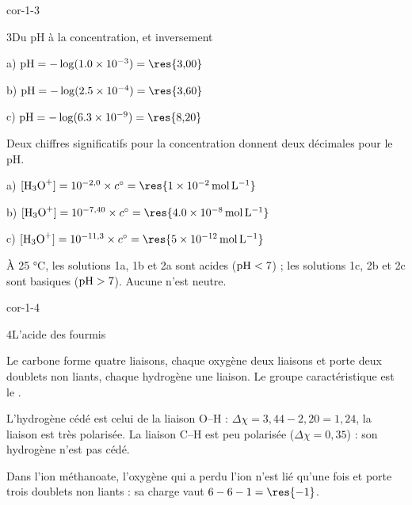 \begin{blocLivre}{cor-1-3}
\begin{corrige}{3}{Du pH à la concentration, et inversement}
\begin{questions}
\item a) $\pH=-\log(\num{1.0e-3})=\res{3{,}00}$\par
b) $\pH=-\log(\num{2.5e-4})=\res{3{,}60}$\par
c) $\pH=-\log(\num{6.3e-9})=\res{8{,}20}$\par
Deux chiffres significatifs pour la concentration donnent deux décimales pour le pH.
\item a) $\hho=10^{-2{,}0}\times\cst=\res{\qty{1e-2}{mol.L^{-1}}}$\par
b) $\hho=10^{-7{,}40}\times\cst=\res{\qty{4,0e-8}{mol.L^{-1}}}$\par
c) $\hho=10^{-11{,}3}\times\cst=\res{\qty{5e-12}{mol.L^{-1}}}$
\item À 25 °C, les solutions 1a, 1b et 2a sont acides ($\mathrm{pH}<7$) ; les solutions 1c, 2b et 2c sont
basiques ($\mathrm{pH}>7$). Aucune n'est neutre.
\end{questions}
\end{corrige}
\end{blocLivre}
\begin{blocLivre}{cor-1-4}
\begin{corrige}{4}{L'acide des fourmis}
\begin{questions}
\item Le carbone forme quatre liaisons, chaque oxygène deux liaisons et porte deux doublets non liants,
chaque hydrogène une liaison. Le groupe caractéristique est le .
\item L'hydrogène cédé est celui de la liaison O--H : $\Delta\chi=3{,}44-2{,}20=1{,}24$, la liaison est
très polarisée. La liaison C--H est peu polarisée ($\Delta\chi=0{,}35$) : son hydrogène n'est pas cédé.
\item Dans l'ion méthanoate, l'oxygène qui a perdu l'ion  n'est lié qu'une fois et porte trois
doublets non liants : sa charge vaut $6-6-1=\res{-1}$.
\end{questions}
\begin{center}
%
\chemmove{\node[pcGroupe,fit=(c4a)(c4b)(c4c)(c4d),inner sep=3.4pt]{};}
\hspace{18mm}
\par
{}
\end{center}
\end{corrige}
\end{blocLivre}
